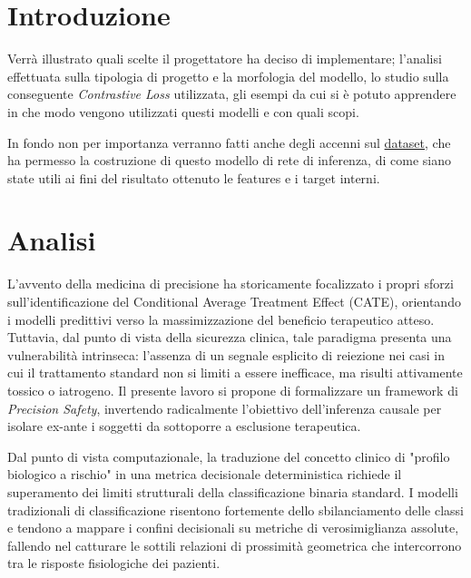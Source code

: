 \documentclass{article}
\begin{document}
\newpage

\tableofcontents
\newpage

\section{Introduzione}
Verrà illustrato quali scelte il progettatore ha deciso di implementare; l'analisi effettuata sulla tipologia di progetto e la morfologia del modello, lo studio sulla conseguente \textit{Contrastive Loss} utilizzata, gli esempi da cui si è potuto apprendere in che modo vengono utilizzati questi modelli e con quali scopi.

In fondo non per importanza verranno fatti anche degli accenni sul \href{https://archive.ics.uci.edu/dataset/890/aids+clinical+trials+group+study+175}{dataset}, che ha permesso la costruzione di questo modello di rete di inferenza, di come siano state utili ai fini del risultato ottenuto le features e i target interni.

\section{Analisi}
L'avvento della medicina di precisione ha storicamente focalizzato i propri sforzi sull'identificazione del Conditional Average Treatment Effect (CATE), orientando i modelli predittivi verso la massimizzazione del beneficio terapeutico atteso. Tuttavia, dal punto di vista della sicurezza clinica, tale paradigma presenta una vulnerabilità intrinseca: l'assenza di un segnale esplicito di reiezione nei casi in cui il trattamento standard non si limiti a essere inefficace, ma risulti attivamente tossico o iatrogeno. Il presente lavoro si propone di formalizzare un framework di \textit{Precision Safety}, invertendo radicalmente l'obiettivo dell'inferenza causale per isolare ex-ante i soggetti da sottoporre a esclusione terapeutica.

Dal punto di vista computazionale, la traduzione del concetto clinico di "profilo biologico a rischio" in una metrica decisionale deterministica richiede il superamento dei limiti strutturali della classificazione binaria standard. I modelli tradizionali di classificazione risentono fortemente dello sbilanciamento delle classi e tendono a mappare i confini decisionali su metriche di verosimiglianza assolute, fallendo nel catturare le sottili relazioni di prossimità geometrica che intercorrono tra le risposte fisiologiche dei pazienti. 
\end{document}
